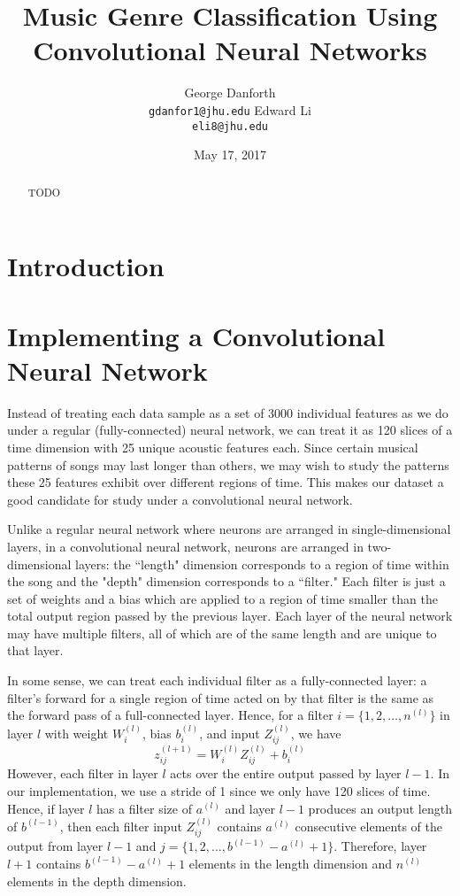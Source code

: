 \documentclass{article} %
\title{Music Genre Classification Using Convolutional Neural Networks}
\author{
George Danforth \\
\texttt{gdanfor1@jhu.edu}
\And\-Edward Li \\
\texttt{eli8@jhu.edu}
}
\date{May 17, 2017}
\begin{document}
\maketitle

\begin{abstract}
TODO
\end{abstract}

\section{Introduction}

\section{Implementing a Convolutional Neural Network}
Instead of treating each data sample as a set of 3000 individual features as we do under a regular (fully-connected) neural network, we can treat it as 120 slices of a time dimension with 25 unique acoustic features each. Since certain musical patterns of songs may last longer than others, we may wish to study the patterns these 25 features exhibit over different regions of time. This makes our dataset a good candidate for study under a convolutional neural network.

Unlike a regular neural network where neurons are arranged in single-dimensional layers, in a convolutional neural network, neurons are arranged in two-dimensional layers: the ``length" dimension corresponds to a region of time within the song and the "depth" dimension corresponds to a ``filter." Each filter is just a set of weights and a bias which are applied to a region of time smaller than the total output region passed by the previous layer. Each layer of the neural network may have multiple filters, all of which are of the same length and are unique to that layer.

In some sense, we can treat each individual filter as a fully-connected layer: a filter's forward for a single region of time acted on by that filter is the same as the forward pass of a full-connected layer. Hence, for a filter $i=\{1,2,\ldots,n^{(l)}\}$ in layer $l$ with weight $W^{(l)}_i$, bias $b^{(l)}_i$, and input $Z^{(l)}_{ij}$, we have
\begin{equation}
    z^{(l+1)}_{ij} = W^{(l)}_i Z^{(l)}_{ij} + b^{(l)}_i
\end{equation}
However, each filter in layer $l$ acts over the entire output passed by layer $l-1$. In our implementation, we use a stride of 1 since we only have 120 slices of time. Hence, if layer $l$ has a filter size of $a^{(l)}$ and layer $l-1$ produces an output length of $b^{(l-1)}$, then each filter input $Z^{(l)}_{ij}$ contains $a^{(l)}$ consecutive elements of the output from layer $l-1$ and $j=\{1,2,\ldots,b^{(l-1)}-a^{(l)}+1\}$. Therefore, layer $l+1$ contains $b^{(l-1)}-a^{(l)}+1$ elements in the length dimension and $n^{(l)}$ elements in the depth dimension.
\end{document}
